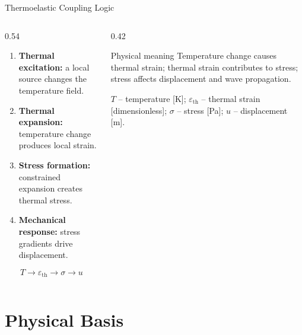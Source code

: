 \documentclass[aspectratio=169,10pt]{beamer}
\begin{document}
\begin{frame}{Thermoelastic Coupling Logic}
  \begin{columns}[T]
    \begin{column}{0.54\textwidth}
      \begin{enumerate}
        \item \textbf{Thermal excitation:} a local source changes the temperature field.
        \item \textbf{Thermal expansion:} temperature change produces local strain.
        \item \textbf{Stress formation:} constrained expansion creates thermal stress.
        \item \textbf{Mechanical response:} stress gradients drive displacement.
      \end{enumerate}
      \[
        T \longrightarrow \varepsilon_{\mathrm{th}}
        \longrightarrow \sigma \longrightarrow u
      \]
    \end{column}
    \begin{column}{0.42\textwidth}
      \footnotesize
      \begin{block}{Physical meaning}
        Temperature change causes thermal strain; thermal strain contributes
        to stress; stress affects displacement and wave propagation.
      \end{block}
      \scriptsize
      $T$ -- temperature [K]; $\varepsilon_{\mathrm{th}}$ -- thermal strain
      [dimensionless]; $\sigma$ -- stress [Pa]; $u$ -- displacement [m].
    \end{column}
  \end{columns}
\end{frame}

\section{Physical Basis}
\end{document}
